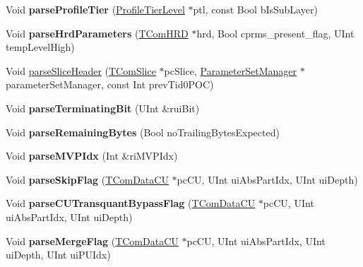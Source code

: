 \begin{DoxyCompactItemize}
Void {\bfseries parse\+Profile\+Tier} (\hyperlink{class_profile_tier_level}{Profile\+Tier\+Level} $\ast$ptl, const Bool b\+Is\+Sub\+Layer)
\item 
\mbox{\label{class_t_dec_cavlc_aaa8fef0104ebbf5e419d3a0681ca1628}} 
Void {\bfseries parse\+Hrd\+Parameters} (\hyperlink{class_t_com_h_r_d}{T\+Com\+H\+RD} $\ast$hrd, Bool cprms\+\_\+present\+\_\+flag, U\+Int temp\+Level\+High)
\item 
Void \hyperlink{class_t_dec_cavlc_aa33e7c9e232a7e353997333d59a9cf40}{parse\+Slice\+Header} (\hyperlink{class_t_com_slice}{T\+Com\+Slice} $\ast$pc\+Slice, \hyperlink{class_parameter_set_manager}{Parameter\+Set\+Manager} $\ast$parameter\+Set\+Manager, const Int prev\+Tid0\+P\+OC)
\item 
\mbox{\label{class_t_dec_cavlc_acccb3a86a009b642b4488d081c270bcb}} 
Void {\bfseries parse\+Terminating\+Bit} (U\+Int \&rui\+Bit)
\item 
\mbox{\label{class_t_dec_cavlc_afe1e72b3aa4517e94bbcdfbbdcae0ae9}} 
Void {\bfseries parse\+Remaining\+Bytes} (Bool no\+Trailing\+Bytes\+Expected)
\item 
\mbox{\label{class_t_dec_cavlc_adce5d355efcb7e87747e4e7e66a18f30}} 
Void {\bfseries parse\+M\+V\+P\+Idx} (Int \&ri\+M\+V\+P\+Idx)
\item 
\mbox{\label{class_t_dec_cavlc_aef1a12e85bbb41c4563c2843925fd51c}} 
Void {\bfseries parse\+Skip\+Flag} (\hyperlink{class_t_com_data_c_u}{T\+Com\+Data\+CU} $\ast$pc\+CU, U\+Int ui\+Abs\+Part\+Idx, U\+Int ui\+Depth)
\item 
\mbox{\label{class_t_dec_cavlc_a8a4cbeeb41660b09c9aca7110b560f58}} 
Void {\bfseries parse\+C\+U\+Transquant\+Bypass\+Flag} (\hyperlink{class_t_com_data_c_u}{T\+Com\+Data\+CU} $\ast$pc\+CU, U\+Int ui\+Abs\+Part\+Idx, U\+Int ui\+Depth)
\item 
\mbox{\label{class_t_dec_cavlc_a10bcc8eb9ddf933af7bbc730e4ade262}} 
Void {\bfseries parse\+Merge\+Flag} (\hyperlink{class_t_com_data_c_u}{T\+Com\+Data\+CU} $\ast$pc\+CU, U\+Int ui\+Abs\+Part\+Idx, U\+Int ui\+Depth, U\+Int ui\+P\+U\+Idx)
\item 

\end{DoxyCompactItemize}
